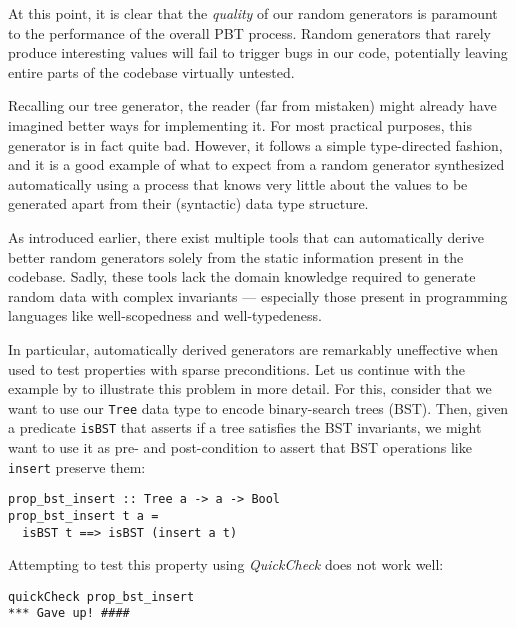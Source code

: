 \documentclass[acmsmall, anonymous]{acmart}
\newcommand{\quickcheck}{\textit{QuickCheck}\xspace}
\begin{document}
At this point, it is clear that the \emph{quality} of our random generators is
paramount to the performance of the overall PBT process.
%
Random generators that rarely produce interesting values will fail to trigger
bugs in our code, potentially leaving entire parts of the codebase virtually
untested.


Recalling our tree generator, the reader (far from mistaken) might already have
imagined better ways for implementing it.
%
For most practical purposes, this generator is in fact quite bad.
%
However, it follows a simple type-directed fashion, and it is a good example of
what to expect from a random generator synthesized automatically using a process
that knows very little about the values to be generated apart from their
(syntactic) data type structure.

As introduced earlier, there exist multiple tools that can automatically derive
better random generators solely from the static information present in the
codebase.
%
%
Sadly, these tools lack the domain knowledge required to generate random data
with complex invariants --- especially those present in programming languages
like well-scopedness and well-typedeness.


In particular, automatically derived generators are remarkably uneffective when
used to test properties with sparse preconditions.
%
Let us continue with the example by \citeauthor{lampropoulos2019coverage} to
illustrate this problem in more detail.
%
For this, consider that we want to use our \texttt{Tree} data type to encode
binary-search trees (BST).
%
Then, given a predicate \texttt{isBST} that asserts if a tree satisfies the BST
invariants, we might want to use it as pre- and post-condition to assert that
BST operations like \texttt{insert} preserve them:

\begin{verbatim}
prop_bst_insert :: Tree a -> a -> Bool
prop_bst_insert t a =
  isBST t ==> isBST (insert a t)
\end{verbatim}

\noindent Attempting to test this property using \quickcheck does not work well:

\begin{verbatim}
quickCheck prop_bst_insert
*** Gave up! ####
\end{verbatim}
\end{document}
